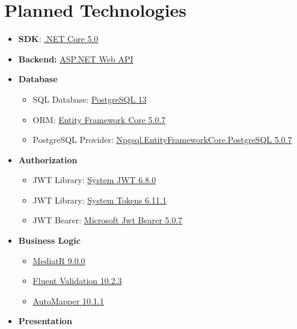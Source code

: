 \section{Planned Technologies}\label{sec:planned-technologies}
\begin{itemize}
    \item \textbf{SDK}: \href{https://dotnet.microsoft.com/download/dotnet/5.0}{.NET Core 5.0}
    \item \textbf{Backend:} \href{https://dotnet.microsoft.com/apps/aspnet}{ASP.NET Web API}
    \item \textbf{Database}
    \begin{itemize}
        \item SQL Database: \href{https://www.postgresql.org/}{PostgreSQL 13}
        \item ORM: \href{https://www.nuget.org/packages/Microsoft.EntityFrameworkCore/5.0.7?_src=template}{Entity Framework Core 5.0.7}
        \item PostgreSQL Provider: \href{https://www.nuget.org/packages/Npgsql.EntityFrameworkCore.PostgreSQL/5.0.7?_src=template}{Npgsql.EntityFrameworkCore.PostgreSQL 5.0.7}
    \end{itemize}
    \item \textbf{Authorization}
    \begin{itemize}
        \item JWT Library: \href{https://www.nuget.org/packages/System.IdentityModel.Tokens.Jwt}{System JWT 6.8.0}
        \item JWT Library: \href{https://www.nuget.org/packages/System.IdentityModel.Tokens}{System Tokens 6.11.1}
        \item JWT Bearer: \href{https://www.nuget.org/packages/Microsoft.AspNetCore.Authentication.JwtBearer/5.0.7?_src=template}{Microsoft Jwt Bearer 5.0.7}
    \end{itemize}
    \item \textbf{Business Logic}
    \begin{itemize}
        \item \href{https://www.nuget.org/packages/MediatR/9.0.0?_src=template}{MediatR 9.0.0}
        \item \href{https://www.nuget.org/packages/FluentValidation/10.2.3?_src=template}{Fluent Validation 10.2.3}
        \item \href{https://www.nuget.org/packages/AutoMapper/}{AutoMapper 10.1.1}
    \end{itemize}
    \item \textbf{Presentation}

\end{itemize}

